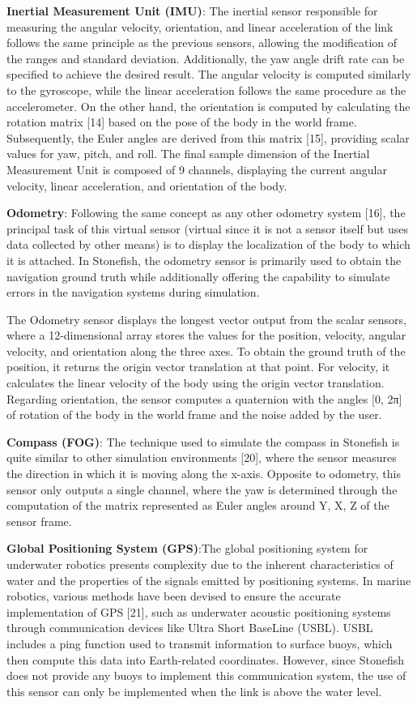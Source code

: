 \documentclass[]{article}
\begin{document}
		\textbf{Inertial Measurement Unit (IMU)}: The inertial sensor responsible for measuring the angular velocity, orientation, and linear acceleration of the link follows the same principle as the previous sensors, allowing the modification of the ranges and standard deviation. Additionally, the yaw angle drift rate can be specified to achieve the desired result. The angular velocity is computed similarly to the gyroscope, while the linear acceleration follows the same procedure as the accelerometer. On the other hand, the orientation is computed by calculating the rotation matrix [14] based on the pose of the body in the world frame. Subsequently, the Euler angles are derived from this matrix [15], providing scalar values for yaw, pitch, and roll. The final sample dimension of the Inertial Measurement Unit is composed of 9 channels, displaying the current angular velocity, linear acceleration, and orientation of the body. 
		
		\textbf{Odometry}: Following the same concept as any other odometry system [16], the principal task of this virtual sensor (virtual since it is not a sensor itself but uses data collected by other means) is to display the localization of the body to which it is attached. In Stonefish, the odometry sensor is primarily used to obtain the navigation ground truth while additionally offering the capability to simulate errors in the navigation systems during simulation.
		
		The Odometry sensor displays the longest vector output from the scalar sensors, where a 12-dimensional array stores the values for the position, velocity, angular velocity, and orientation along the three axes. To obtain the ground truth of the position, it returns the origin vector translation at that point. For velocity, it calculates the linear velocity of the body using the origin vector translation. Regarding orientation, the sensor computes a quaternion with the angles [0, 2π] of rotation of the body in the world frame and the noise added by the user.
		
		\textbf{Compass (FOG)}: The technique used to simulate the compass in Stonefish is quite similar to other simulation environments [20], where the sensor measures the direction in which it is moving along the x-axis. Opposite to odometry, this sensor only outputs a single channel, where the yaw is determined through the computation of the matrix represented as Euler angles around Y, X, Z of the sensor frame.
		
		\textbf{Global Positioning System (GPS)}:The global positioning system for underwater robotics presents complexity due to the inherent characteristics of water and the properties of the signals emitted by positioning systems. In marine robotics, various methods have been devised to ensure the accurate implementation of GPS [21], such as underwater acoustic positioning systems through communication devices like Ultra Short BaseLine (USBL). USBL includes a ping function used to transmit information to surface buoys, which then compute this data into Earth-related coordinates. However, since Stonefish does not provide any buoys to implement this communication system, the use of this sensor can only be implemented when the link is above the water level.
		
\end{document}
